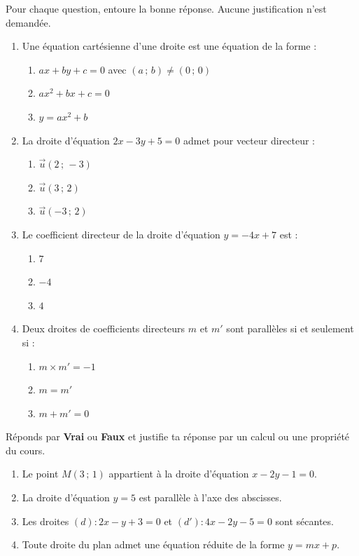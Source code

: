\documentclass[11pt]{article}
\begin{document}
\begin{exercice}
Pour chaque question, entoure la bonne réponse. Aucune justification n'est demandée.
\begin{enumerate}
\item Une équation cartésienne d'une droite est une équation de la forme :
\begin{enumerate}
\item $ax + by + c = 0$ avec $(a\,;\,b) \neq (0\,;\,0)$
\item $ax^2 + bx + c = 0$
\item $y = ax^2 + b$
\end{enumerate}
\item La droite d'équation $2x - 3y + 5 = 0$ admet pour vecteur directeur :
\begin{enumerate}
\item $\vec{u}(2\,;\,-3)$
\item $\vec{u}(3\,;\,2)$
\item $\vec{u}(-3\,;\,2)$
\end{enumerate}
\item Le coefficient directeur de la droite d'équation $y = -4x + 7$ est :
\begin{enumerate}
\item $7$
\item $-4$
\item $4$
\end{enumerate}
\item Deux droites de coefficients directeurs $m$ et $m'$ sont parallèles si et seulement si :
\begin{enumerate}
\item $m \times m' = -1$
\item $m = m'$
\item $m + m' = 0$
\end{enumerate}
\end{enumerate}
\end{exercice}

\begin{exercice}
Réponds par \textbf{Vrai} ou \textbf{Faux} et justifie ta réponse par un calcul ou une propriété du cours.
\begin{enumerate}
\item Le point $M(3\,;\,1)$ appartient à la droite d'équation $x - 2y - 1 = 0$.
\item La droite d'équation $y = 5$ est parallèle à l'axe des abscisses.
\item Les droites $(d) : 2x - y + 3 = 0$ et $(d') : 4x - 2y - 5 = 0$ sont sécantes.
\item Toute droite du plan admet une équation réduite de la forme $y = mx + p$.
\end{enumerate}
\end{exercice}
\end{document}
